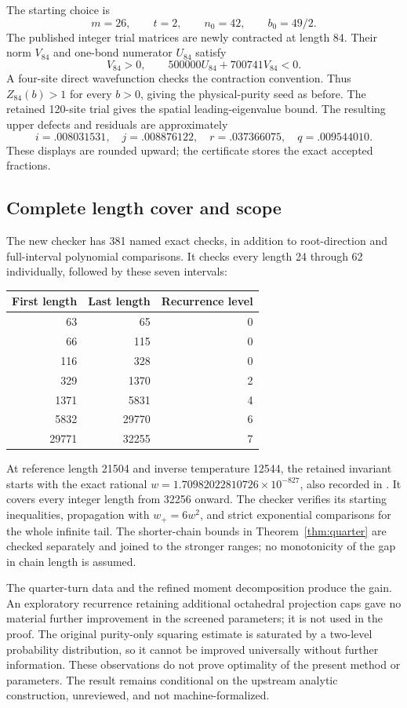 The starting choice is
\[
 m=26,\qquad t=2,\qquad n_0=42,\qquad b_0=49/2.
\]
The published integer trial matrices are newly contracted at length 84.
Their norm $V_{84}$ and one-bond numerator $U_{84}$ satisfy
\[
 V_{84}>0,\qquad500000U_{84}+700741V_{84}<0.
\]
A four-site direct wavefunction checks the contraction convention.
Thus $Z_{84}(b)>1$ for every $b>0$, giving the physical-purity seed as
before. The retained 120-site trial gives the spatial leading-eigenvalue
bound. The resulting upper defects and residuals are approximately
\[
 i=.008031531,\quad j=.008876122,\quad
 r=.037366075,\quad q=.009544010.
\]
These displays are rounded upward; the certificate stores the exact
accepted fractions.

\subsection{Complete length cover and scope}
The new checker has 381 named exact checks, in addition to root-direction
and full-interval polynomial comparisons. It checks every length
24 through 62 individually, followed by these seven intervals:
\begin{center}
\begin{tabular}{rrr}
\toprule First length & Last length & Recurrence level\\\midrule
63 & 65 & 0\\
66 & 115 & 0\\
116 & 328 & 0\\
329 & 1370 & 2\\
1371 & 5831 & 4\\
5832 & 29770 & 6\\
29771 & 32255 & 7\\\bottomrule
\end{tabular}
\end{center}
At reference length 21504 and inverse temperature 12544, the retained
invariant starts with the exact rational
$w=1.70982022810726\times10^{-827}$, also recorded in
. It covers every
integer length from 32256 onward. The checker verifies its starting
inequalities, propagation with $w_+=6w^2$, and strict exponential
comparisons for the whole infinite tail. The shorter-chain bounds in
Theorem~\ref{thm:quarter} are checked separately and joined to the
stronger ranges; no monotonicity of the gap in chain length is assumed.

The quarter-turn data and the refined moment decomposition produce the
gain. An exploratory recurrence retaining additional octahedral
projection caps gave no material further improvement in the screened
parameters; it is not used in the proof. The original purity-only
squaring estimate is saturated by a two-level probability distribution,
so it cannot be improved universally without further information.
These observations do not prove optimality of the present method or
parameters. The result remains conditional on the upstream analytic
construction, unreviewed, and not machine-formalized.
